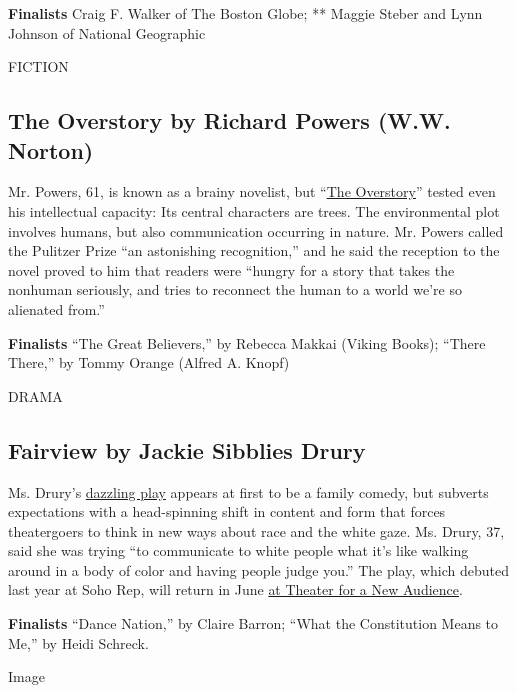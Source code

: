 \textbf{Finalists} Craig F. Walker of The Boston Globe; ** Maggie Steber
and Lynn Johnson of National Geographic

FICTION

\hypertarget{the-overstory-by-richard-powers-ww-norton}{%
\subsection{The Overstory by Richard Powers (W.W.
Norton)}\label{the-overstory-by-richard-powers-ww-norton}}

Mr. Powers, 61, is known as a brainy novelist, but
``\href{https://www.nytimes3xbfgragh.onion/2018/04/09/books/review/overstory-richard-powers.html}{The
Overstory}'' tested even his intellectual capacity: Its central
characters are trees. The environmental plot involves humans, but also
communication occurring in nature. Mr. Powers called the Pulitzer Prize
``an astonishing recognition,'' and he said the reception to the novel
proved to him that readers were ``hungry for a story that takes the
nonhuman seriously, and tries to reconnect the human to a world we're so
alienated from.''

\textbf{Finalists} ``The Great Believers,'' by Rebecca Makkai (Viking
Books); ``There There,'' by Tommy Orange (Alfred A. Knopf)

DRAMA

\hypertarget{fairview-by-jackie-sibblies-drury}{%
\subsection{Fairview by Jackie Sibblies
Drury}\label{fairview-by-jackie-sibblies-drury}}

Ms. Drury's
\href{https://www.nytimes3xbfgragh.onion/2018/06/17/theater/review-theater-as-sabotage-in-the-dazzling-fairview.html}{dazzling
play} appears at first to be a family comedy, but subverts expectations
with a head-spinning shift in content and form that forces theatergoers
to think in new ways about race and the white gaze. Ms. Drury, 37, said
she was trying ``to communicate to white people what it's like walking
around in a body of color and having people judge you.'' The play, which
debuted last year at Soho Rep, will return in June
\href{https://www.tfana.org/current-season/fairview/overview}{at Theater
for a New Audience}.

\textbf{Finalists} ``Dance Nation,'' by Claire Barron; ``What the
Constitution Means to Me,'' by Heidi Schreck.

Image

